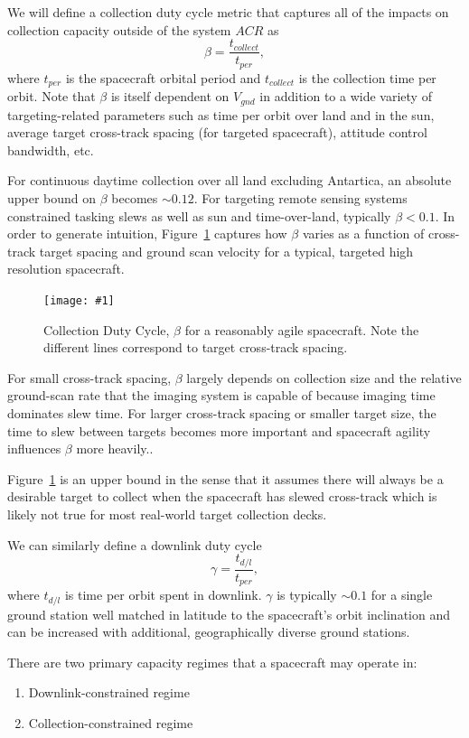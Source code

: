 \documentclass[10pt,journal]{IEEEtran}  %
\newcommand{\includefigure}[3]
{
  \begin{figure}[h!]
  \centering
  \texttt{[image: \#1]}
  \caption[]{#3}
  \label{#2}
  \end{figure}
}
\begin{document}
We will define a collection duty cycle metric that captures all of the impacts on collection capacity outside of the system $ACR$ as
\begin{equation}
    \beta = \frac{t_{collect}}{t_{per}},
\end{equation} 
where $t_{per}$ is the spacecraft orbital period and $t_{collect}$ is the collection time per orbit.  Note that $\beta$ is itself dependent on $V_{gnd}$ in addition to a wide variety of targeting-related parameters such as time per orbit over land and in the sun, average target cross-track spacing (for targeted spacecraft), attitude control bandwidth, etc.

For continuous daytime collection over all land excluding Antartica, an absolute upper bound on $\beta$ becomes $\sim 0.12$.  For targeting remote sensing systems constrained tasking slews as well as sun and time-over-land, typically $\beta < 0.1$.  In order to generate intuition, Figure~\ref{fig:beta} captures how $\beta$ varies as a function of cross-track target spacing and ground scan velocity for a typical, targeted high resolution spacecraft.

\includefigure{figures/collection_dc.pgf}{fig:beta}{Collection Duty Cycle, $\beta$ for a reasonably agile spacecraft.  Note the different lines correspond to target cross-track spacing.}

For small cross-track spacing, $\beta$ largely depends on collection size and the relative ground-scan rate that the imaging system is capable of because imaging time dominates slew time.  For larger cross-track spacing or smaller target size, the time to slew between targets becomes more important and spacecraft agility influences $\beta$ more heavily..

Figure~\ref{fig:beta} is an upper bound in the sense that it assumes there will always be a desirable target to collect when the spacecraft has slewed cross-track which is likely not true for most real-world target collection decks.  

We can similarly define a downlink duty cycle
\begin{equation}
    \gamma = \frac{t_{d/l}}{t_{per}},
\end{equation}
where $t_{d/l}$ is time per orbit spent in downlink.  $\gamma$ is typically $\sim 0.1$ for a single ground station well matched in latitude to the spacecraft's orbit inclination and can be increased with additional, geographically diverse ground stations.

There are two primary capacity regimes that a spacecraft may operate in:
\begin{enumerate}
\item Downlink-constrained regime
\item Collection-constrained regime
\end{enumerate}
\end{document}
